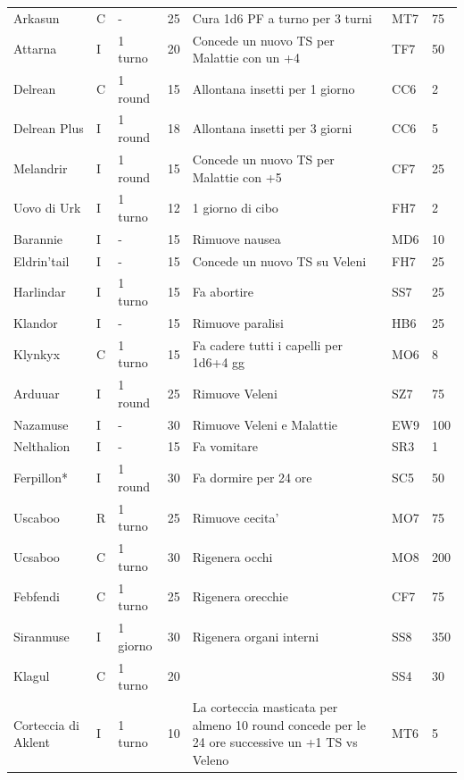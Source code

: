 \documentclass[a4paper,11pt,twoside,openany]{book}
\begin{document}
{\begin{longtable}{|L{3.2cm} |k{0.7cm} |k{1.7cm}| D{1cm} |L{5cm} |k{1.5cm} |k{1cm}|}
Arkasun & C & - & 25 & Cura 1d6 PF a turno per 3 turni & MT7 & 75\\
Attarna & I & 1 turno & 20 & Concede un nuovo TS per Malattie con un +4& TF7 & 50\\
Delrean & C & 1 round & 15 & Allontana insetti per 1 giorno & CC6 & 2\\
Delrean Plus & I & 1 round & 18 & Allontana insetti per 3 giorni & CC6 & 5\\
Melandrir & I & 1 round & 15 & Concede un nuovo TS per Malattie con +5 & CF7 & 25\\
Uovo di Urk & I & 1 turno & 12 & 1 giorno di cibo & FH7 & 2\\
Barannie & I & - & 15 & Rimuove nausea & MD6 & 10\\
Eldrin'tail & I & - & 15 & Concede un nuovo TS su Veleni & FH7 & 25\\
Harlindar & I & 1 turno & 15 & Fa abortire & SS7 & 25\\
Klandor & I & - & 15 & Rimuove paralisi & HB6 & 25\\
Klynkyx & C & 1 turno & 15 & Fa cadere tutti i capelli per 1d6+4 gg & MO6 & 8\\
Arduuar & I & 1 round & 25 & Rimuove Veleni & SZ7 & 75\\
Nazamuse & I & - & 30 & Rimuove Veleni e Malattie & EW9 & 100\\
Nelthalion & I & - & 15 & Fa vomitare & SR3 & 1\\
Ferpillon{*} & I & 1 round & 30 & Fa dormire per 24 ore & SC5 & 50\\
Uscaboo & R & 1 turno & 25 & Rimuove cecita' & MO7 & 75\\
Ucsaboo  & C & 1 turno & 30 & Rigenera occhi & MO8 & 200\\
Febfendi  & C & 1 turno & 25 & Rigenera orecchie & CF7 & 75\\
Siranmuse & I & 1 giorno & 30 & Rigenera organi interni & SS8 & 350\\
Klagul & C & 1 turno & 20 & & SS4 & 30\\
Corteccia di Aklent & I & 1 turno & 10 & La corteccia masticata per almeno 10 round concede per le 24 ore successive un +1 TS vs Veleno& MT6 & 5\\

\end{longtable}}
\end{document}
